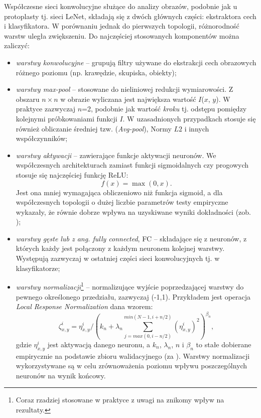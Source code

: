 Współczesne sieci konwolucyjne służące do analizy obrazów, podobnie jak u protoplasty tj. sieci LeNet, składają się z dwóch głównych części: ekstraktora cech \linebreak i klasyfikatora. W porównaniu jednak do pierwszych topologii, różnorodność warstw uległa zwiększeniu. Do najczęściej stosowanych komponentów można zaliczyć:
\begin{itemize}[noitemsep,nolistsep]
	\item \textit{warstwy konwolucyjne} -- grupują filtry używane do ekstrakcji cech obrazowych różnego poziomu (np. krawędzie, skupiska, obiekty);
	\item \textit{warstwy max-pool} -- stosowane do nieliniowej redukcji wymiarowości. Z obszaru $n\times$$n$ w obrazie wyliczana jest największa wartość $I$($x$, $y$). W praktyce zazwyczaj $n$=2, podobnie jak wartość \textit{kroku} tj. odstępu pomiędzy kolejnymi próbkowaniami funkcji $I$. W uzasadnionych przypadkach stosuje się również obliczanie średniej tzw. (\textit{Avg-pool}), Normy $L2$ i innych współczynników;
	\item \textit{warstwy aktywacji} -- zawierające funkcje aktywacji neuronów. We współczesnych architekturach zamiast funkcji sigmoidalnych czy progowych stosuje się najczęściej funkcję ReLU:
	\begin{equation}
		f(x) = \max(0, x).
	\end{equation}
	Jest ona mniej wymagająca obliczeniowo niż funkcja sigmoid, a dla współczesnych topologii o dużej liczbie parametrów testy empiryczne wykazały, \linebreak że równie dobrze wpływa na uzyskiwane wyniki dokładności (zob. \cite{Krizhevsky2012}); 
	\item \textit{warstwy gęste lub z ang. fully connected}, FC -- składające się z neuronów, \linebreak z których każdy jest połączony z każdym neuronem kolejnej warstwy. Występują zazwyczaj w ostatniej części sieci konwolucyjnych tj. w klasyfikatorze;
	\item \textit{warstwy normalizacji}\footnote{Coraz rzadziej stosowane w praktyce z uwagi na znikomy wpływ na rezultaty.} -- normalizujące wyjście poprzedzającej warstwy \linebreak do pewnego określonego przedziału, zazwyczaj (-1,1). Przykładem jest operacja \textit{Local Response Normalization} dana wzorem:
	\begin{equation}
	\label{DLnormEquation}
	\zeta_{x,y}^{i} = \eta_{x,y}^{i}/\left ( k_n + \lambda_n \sum_{j=max(0,i-n/2)}^{min(N-1,i+n/2)}(\eta_{x,y}^{i})^2 \right )^{\beta_n},
	\end{equation}
	gdzie $\eta_{x,y}^{i}$ jest aktywacją danego neuronu, a $k_n$, $\lambda_n$, $n$ i $\beta_n$ to stałe dobierane empirycznie na podstawie zbioru walidacyjnego (za \cite{Krizhevsky2012}). Warstwy normalizacji wykorzystywane są w celu zrównoważenia poziomu wpływu poszczególnych neuronów na wynik końcowy.
\end{itemize}

